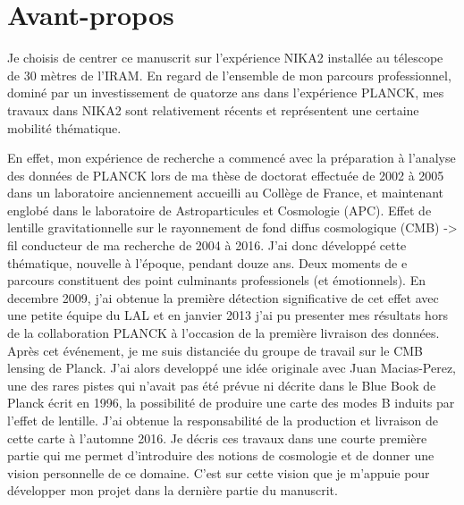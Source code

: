 \documentclass[a4paper, 12pt]{report}
\begin{document}




%
\newpage
\tableofcontents
\newpage


% 
%

\chapter*{Avant-propos}

Je choisis de centrer ce manuscrit sur l'expérience NIKA2 installée au
télescope de 30 mètres de l'IRAM. En regard de l'ensemble de mon parcours
professionnel, dominé par un investissement de quatorze ans dans
l'expérience PLANCK, mes travaux dans NIKA2 sont relativement récents
et représentent une certaine mobilité thématique.

En effet, mon expérience de recherche a commencé avec la préparation
à l'analyse des données de PLANCK lors de ma thèse de doctorat
effectuée de 2002 à 2005 dans un laboratoire anciennement accueilli au
Collège de France, et maintenant englobé dans le laboratoire
de Astroparticules et Cosmologie (APC). Effet de lentille
gravitationnelle sur le rayonnement de fond diffus cosmologique (CMB)
-> fil conducteur de ma recherche de 2004 à 2016. J'ai donc développé
cette thématique, nouvelle à l'époque, pendant douze ans. Deux moments
de e parcours constituent des point culminants professionels (et
émotionnels). En decembre 2009, j'ai obtenue la première détection
significative de cet effet avec une petite équipe du LAL et en janvier
2013 j'ai pu presenter mes résultats hors de la collaboration PLANCK à
l'occasion de la première livraison des données. Après cet événement, je me suis
distanciée du groupe de travail sur le CMB lensing de Planck. J'ai
alors developpé une idée originale avec Juan Macias-Perez, une des
rares pistes qui n'avait pas été prévue ni décrite dans le Blue Book
de Planck écrit en 1996, la possibilité de produire une carte des
modes B induits par l'effet de lentille. J'ai obtenue la
responsabilité de la production et livraison de cette carte à
l'automne 2016. Je décris ces travaux dans une courte première partie
qui me permet d'introduire des notions de cosmologie et de donner une
vision personnelle de ce domaine. C'est sur cette vision que je
m'appuie pour développer mon projet dans la dernière partie du
manuscrit.
\end{document}
